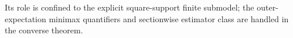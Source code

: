 Its role is confined to the explicit square-support finite submodel; the outer-expectation minimax quantifiers and sectionwise estimator class are handled in the converse theorem.
